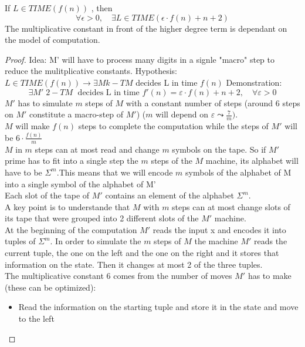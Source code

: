 \begin{theorem}
    If $L \in TIME(f(n))$ , then \[ 
        \forall \epsilon > 0,\quad \exists L \in TIME(\epsilon \cdot f(n)+n+2) 
    \]
    The multiplicative constant in front of the higher degree term is dependant on the model of computation.
    \begin{proof}
        Idea: M' will have to process many digits in a signle "macro" step to reduce the mulitplicative constants.
        Hypothesis:\\
        $L \in TIME(f(n)) \rightarrow \exists M k-TM$ decides L in time $f(n)$
        Demonstration:\\
        \[ 
            \exists M'\; 2-TM\; \text{ decides L in time } f'(n)=\varepsilon \cdot f(n)+n+2, \quad \forall \varepsilon >0
        \]
        $M'$ has to simulate $m$ steps of $M$ with a constant number of steps (around 6 steps on $M'$ constitute a macro-step of $M'$) ($m$ will depend on $\varepsilon \leadsto \frac{7}{m})$.\\
        $M$ will make $f(n)$ steps to complete the computation while the steps of $M'$ will be $6 \cdot \frac{f(n)}{m}$\\
        $M$ in $m$ steps can at most read and change $m$ symbols on the tape. So if $M'$ prime has to fit into a single step the $m$ steps of the $M$ machine, its alphabet will have to be $\Sigma^m$.This means that we will encode $m$ symbols of the alphabet of M into a single symbol of the alphabet of M'\\
        Each slot of the tape of $M'$ contains an element of the alphabet $\Sigma^m$.\\
        A key point is to understande that $M$ with $m$ steps can at most change slots of its tape that were grouped into 2 different slots of the $M'$ machine.\\
        At the beginning of the computation $M'$ reads the input x and encodes it into tuples of $\Sigma^m$.
        In order to simulate the $m$ steps of $M$ the machine $M'$ reads the current tuple, the one on the left and the one on the right and it stores that information on the state. Then it changes at most 2 of the three tuples.\\The multiplicative constant 6 comes from the number of moves $M'$ has to make (these can be optimized):
        \begin{itemize}
            \item Read the information on the starting tuple and store it in the state and move to the left

\end{itemize}
\end{proof}
\end{theorem}
